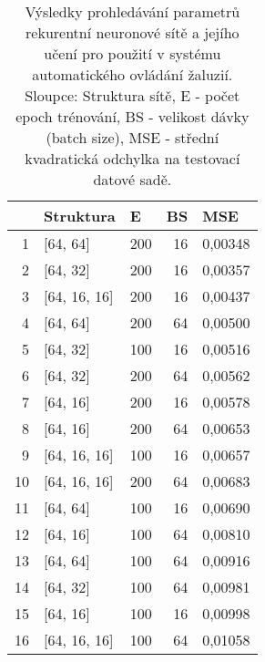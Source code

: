 \begin{table}[htbp]
  \centering
    \begin{tabular}{r|l|r|r|r}
    \toprule
          & Struktura & \multicolumn{1}{l|}{E} & \multicolumn{1}{l|}{BS} & \multicolumn{1}{l}{MSE} \\
    \midrule
    \midrule
    1     & {[64, 64]} & 200   & 16    & 0,00348 \\
    \midrule
    2     & {[64, 32]} & 200   & 16    & 0,00357 \\
    \midrule
    3     & {[64, 16, 16]} & 200   & 16    & 0,00437 \\
    \midrule
    4     & {[64, 64]} & 200   & 64    & 0,00500 \\
    \midrule
    5     & {[64, 32]} & 100   & 16    & 0,00516 \\
    \midrule
    6     & {[64, 32]} & 200   & 64    & 0,00562 \\
    \midrule
    7     & {[64, 16]} & 200   & 16    & 0,00578 \\
    \midrule
    8     & {[64, 16]} & 200   & 64    & 0,00653 \\
    \midrule
    9     & {[64, 16, 16]} & 100   & 16    & 0,00657 \\
    \midrule
    10    & {[64, 16, 16]} & 200   & 64    & 0,00683 \\
    \midrule
    11    & {[64, 64]} & 100   & 16    & 0,00690 \\
    \midrule
    12    & {[64, 16]} & 100   & 64    & 0,00810 \\
    \midrule
    13    & {[64, 64]} & 100   & 64    & 0,00916 \\
    \midrule
    14    & {[64, 32]} & 100   & 64    & 0,00981 \\
    \midrule
    15    & {[64, 16]} & 100   & 16    & 0,00998 \\
    \midrule
    16    & {[64, 16, 16]} & 100   & 64    & 0,01058 \\
    \bottomrule
    \bottomrule
    \end{tabular}%
  \caption[Výsledky prohledávání parametrů LSTM]{Výsledky prohledávání parametrů rekurentní neuronové sítě a jejího učení pro použití v systému automatického ovládání žaluzií. Sloupce: Struktura sítě, E - počet epoch trénování, BS - velikost dávky (batch size), MSE - střední kvadratická odchylka na testovací datové sadě.}
  \label{tab:lstmhyperResults}%
\end{table}%

